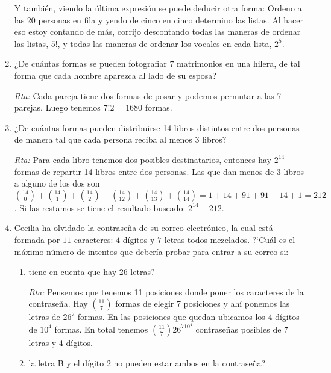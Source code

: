 \begin{enumerate}
    Y también, viendo la última expresión se puede deducir otra forma: Ordeno a las 20 personas en fila y yendo de cinco en cinco determino las listas. Al hacer eso estoy contando de más, corrijo descontando todas las maneras de ordenar las listas, $5!$, y todas las maneras de ordenar los vocales en cada lista, $2^5$.
    
    
    
    \item ¿De cuántas formas se pueden fotografiar 7 matrimonios en una hilera, de tal forma
    que cada hombre aparezca al lado de su esposa?
    
    \noindent\textit{Rta:} Cada pareja tiene dos formas de posar y podemos permutar a las 7 parejas. Luego tenemos $7!2=1680$ formas.
    
    
    
    \item ¿De cuántas formas pueden distribuirse 14 libros distintos entre dos personas de
    manera tal que cada persona reciba al menos 3 libros?
    
    \noindent\textit{Rta:} Para cada libro tenemos dos posibles destinatarios, entonces hay $2^{14}$ formas de repartir 14 libros entre dos personas.  Las que dan menos de 3 libros a alguno de los dos son $\binom{14}{0}+\binom{14}{1}+\binom{14}{2}+\binom{14}{12}+\binom{14}{13}+\binom{14}{14}=1+14+91+91+14+1=212$. Si las restamos se tiene el resultado buscado: $2^{14}-212$.
    
    \smallskip
    
    \item
    Cecilia ha olvidado la contraseña de su correo electrónico, la cual est\'a formada por $11$ caracteres: $4$ d\'igitos y $7$ letras todos mezclados. ?`Cu\'al es el m\'aximo n\'umero de intentos que deber\'ia probar para entrar a su correo si:
    \begin{enumerate}
        \item  tiene en cuenta que hay 26 letras?
        
        \textit{Rta:} Pensemos que tenemos 11 posiciones donde poner los caracteres de la contraseña. Hay $\binom{11}{7}$ formas de elegir 7 posiciones y ahí ponemos las letras de $26^7$ formas. En  las  posiciones que quedan ubicamos los 4 dígitos de $10^4$ formas. En total tenemos $\binom{11}{7}26^710^4$   contraseñas posibles de 7 letras y 4 dígitos.
        
        \item la letra B y el d\'igito 2 no pueden estar ambos en la contraseña?
        

\end{enumerate}
\end{enumerate}
